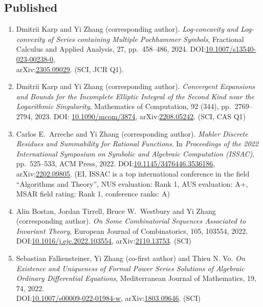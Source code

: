 \documentclass[a4paper,12pt]{article}
\begin{document}
\subsection*{Published}
\begin{enumerate}
\item Dmitrii Karp and Yi Zhang (corresponding author). {\em Log-concavity and Log-convexity of Series containing Multiple Pochhammer Symbols},  Fractional Calculus and Applied Analysis, 27, pp.\ 458--486, 2024. DOI:\href{https://doi.org/10.1007/s13540-023-00238-0}{10.1007/s13540-023-00238-0}, \\ arXiv:\href{https://arxiv.org/abs/2305.09029}{2305.09029}.  (SCI, JCR Q1). 
\item Dmitrii Karp and Yi Zhang (corresponding author). {\em Convergent Expansions and Bounds for the Incomplete Elliptic Integral of the Second Kind near the Logarithmic Singularity},  Mathematics of Computation, 92 (344), pp.\ 2769--2794, 2023. DOI: \href{https://doi.org/10.1090/mcom/3874}{10.1090/mcom/3874}, arXiv:\href{https://arxiv.org/abs/2208.05242}{2208.05242}. (SCI, CAS Q1)
\item Carlos E.\ Arreche and Yi Zhang (corresponding author). 
{\em Mahler Discrete Residues and Summability for Rational Functions}. In {\em Proceedings of the 2022 International Symposium on Symbolic and Algebraic Computation (ISSAC)}, 
pp.\ 525–533, ACM Press, 2022. DOI:\href{https://dl.acm.org/doi/10.1145/3476446.3536186}{10.1145/3476446.3536186},
arXiv:\href{https://arxiv.org/abs/2202.09805}{2202.09805}.  (EI, ISSAC is a top international conference in the field ``Algorithms and Theory'', NUS evaluation: Rank 1, AUS evaluation: A+, MSAR field rating: Rank 1, conference ranks: A) 
\item Alin Bostan, Jordan Tirrell, Bruce W.\ Westbury and Yi Zhang (corresponding author). 
{\em On Some Combinatorial Sequences Associated to Invariant Theory}, European Journal of Combinatorics, 105, 103554, 2022. 
DOI:\href{https://doi.org/10.1016/j.ejc.2022.103554}{10.1016/j.ejc.2022.103554}, 
 arXiv:\href{https://arxiv.org/abs/2110.13753}{2110.13753}.  (SCI)
\item Sebastian Falkensteiner, Yi Zhang (co-first author) and Thieu N. Vo. 
{\em On Existence and Uniqueness of Formal Power Series Solutions of Algebraic Ordinary
     Differential Equations},  Mediterranean Journal of Mathematics, 19, 74, 2022. 
\\ DOI:\href{https://doi.org/10.1007/s00009-022-01984-w}{10.1007/s00009-022-01984-w}, 
arXiv:\href{https://arxiv.org/abs/1803.09646}{1803.09646}. (SCI) 

\end{enumerate}
\end{document}
